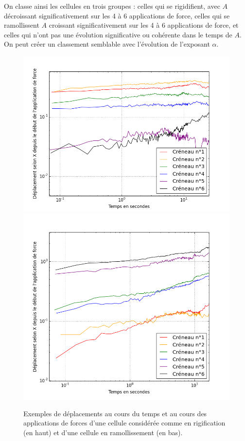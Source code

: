 On classe ainsi les cellules en trois groupes : celles qui se rigidifient, avec $A$ décroissant significativement sur les 4 à 6 applications de force, celles qui se ramollissent $A$ croissant significativement sur les 4 à 6 applications de force, et celles qui n'ont pas une évolution significative ou cohérente dans le temps de $A$. 
On peut créer un classement semblable avec l'évolution de l'exposant $\alpha$. 
\begin{figure}
\includegraphics[scale=0.33]{Figures/Rigidification_exemple_s2c2.png} 
\includegraphics[scale=0.3]{Figures/Ramollissement_exemple_s2c19.png} 
\caption{Exemples de déplacements au cours du temps et au cours des applications de forces d'une cellule considérée comme en rigification (en haut) et d'une cellule en ramollissement (en bas). }
\end{figure}


